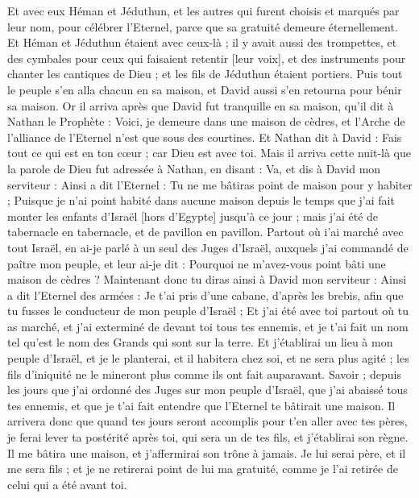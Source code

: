 \begin{multicols}{2}
Et avec eux Héman et Jéduthun, et les autres qui furent choisis et marqués par leur nom, pour célébrer l'Eternel, parce que sa gratuité demeure éternellement.
Et Héman et Jéduthun étaient avec ceux-là ; il y avait aussi des trompettes, et des cymbales pour ceux qui faisaient retentir [leur voix], et des instruments pour chanter les cantiques de Dieu ; et les fils de Jéduthun étaient portiers.
Puis tout le peuple s'en alla chacun en sa maison, et David aussi s'en retourna pour bénir sa maison.
\VerseOne{}Or il arriva après que David fut tranquille en sa maison, qu'il dit à Nathan le Prophète : Voici, je demeure dans une maison de cèdres, et l'Arche de l'alliance de l'Eternel n'est que sous des courtines.
Et Nathan dit à David : Fais tout ce qui est en ton cœur ; car Dieu est avec toi.
Mais il arriva cette nuit-là que la parole de Dieu fut adressée à Nathan, en disant :
Va, et dis à David mon serviteur : Ainsi a dit l'Eternel : Tu ne me bâtiras point de maison pour y habiter ;
Puisque je n'ai point habité dans aucune maison depuis le temps que j'ai fait monter les enfants d'Israël [hors d'Egypte] jusqu'à ce jour ; mais j'ai été de tabernacle en tabernacle, et de pavillon en pavillon.
Partout où i'ai marché avec tout Israël, en ai-je parlé à un seul des Juges d'Israël, auxquels j'ai commandé de paître mon peuple, et leur ai-je dit : Pourquoi ne m'avez-vous point bâti une maison de cèdres ?
Maintenant donc tu diras ainsi à David mon serviteur : Ainsi a dit l'Eternel des armées : Je t'ai pris d'une cabane, d'après les brebis, afin que tu fusses le conducteur de mon peuple d'Israël ;
Et j'ai été avec toi partout où tu as marché, et j'ai exterminé de devant toi tous tes ennemis, et je t'ai fait un nom tel qu'est le nom des Grands qui sont sur la terre.
Et j'établirai un lieu à mon peuple d'Israël, et je le planterai, et il habitera chez soi, et ne sera plus agité ; les fils d'iniquité ne le mineront plus comme ils ont fait auparavant.
Savoir ; depuis les jours que j'ai ordonné des Juges sur mon peuple d'Israël, que j'ai abaissé tous tes ennemis, et que je t'ai fait entendre que l'Eternel te bâtirait une maison.
Il arrivera donc que quand tes jours seront accomplis pour t'en aller avec tes pères, je ferai lever ta postérité après toi, qui sera un de tes fils, et j'établirai son règne.
Il me bâtira une maison, et j'affermirai son trône à jamais.
Je lui serai père, et il me sera fils ; et je ne retirerai point de lui ma gratuité, comme je l'ai retirée de celui qui a été avant toi.

\end{multicols}
